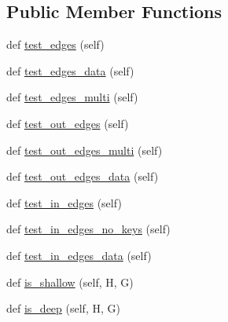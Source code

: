 \subsection*{Public Member Functions}
\begin{DoxyCompactItemize}
\item 
def \hyperlink{classnetworkx_1_1classes_1_1tests_1_1test__multidigraph_1_1BaseMultiDiGraphTester_aabcca493004584a7875a26432d0193cf}{test\+\_\+edges} (self)
\item 
def \hyperlink{classnetworkx_1_1classes_1_1tests_1_1test__multidigraph_1_1BaseMultiDiGraphTester_a5a4aa4bbf8aa82e121752d74f3365c61}{test\+\_\+edges\+\_\+data} (self)
\item 
def \hyperlink{classnetworkx_1_1classes_1_1tests_1_1test__multidigraph_1_1BaseMultiDiGraphTester_ab63cb805f6891bc146e9e20ce471c1f2}{test\+\_\+edges\+\_\+multi} (self)
\item 
def \hyperlink{classnetworkx_1_1classes_1_1tests_1_1test__multidigraph_1_1BaseMultiDiGraphTester_afb3bae3992033a70135a98c76c64c425}{test\+\_\+out\+\_\+edges} (self)
\item 
def \hyperlink{classnetworkx_1_1classes_1_1tests_1_1test__multidigraph_1_1BaseMultiDiGraphTester_a615031058e27dee8aca84f8d74879ff4}{test\+\_\+out\+\_\+edges\+\_\+multi} (self)
\item 
def \hyperlink{classnetworkx_1_1classes_1_1tests_1_1test__multidigraph_1_1BaseMultiDiGraphTester_ad3b6fbf6d62448a2dc9aa2b69a76c59a}{test\+\_\+out\+\_\+edges\+\_\+data} (self)
\item 
def \hyperlink{classnetworkx_1_1classes_1_1tests_1_1test__multidigraph_1_1BaseMultiDiGraphTester_a25f5c3bbbbac4eb189f0881acd0460ef}{test\+\_\+in\+\_\+edges} (self)
\item 
def \hyperlink{classnetworkx_1_1classes_1_1tests_1_1test__multidigraph_1_1BaseMultiDiGraphTester_abf7133fc0db0d416a2f0a2a6046e9ff5}{test\+\_\+in\+\_\+edges\+\_\+no\+\_\+keys} (self)
\item 
def \hyperlink{classnetworkx_1_1classes_1_1tests_1_1test__multidigraph_1_1BaseMultiDiGraphTester_a07285bde43c0013a06495f54e75aadbc}{test\+\_\+in\+\_\+edges\+\_\+data} (self)
\item 
def \hyperlink{classnetworkx_1_1classes_1_1tests_1_1test__multidigraph_1_1BaseMultiDiGraphTester_a4c58fec0238682b0d6a39fa334ad5616}{is\+\_\+shallow} (self, H, G)
\item 
def \hyperlink{classnetworkx_1_1classes_1_1tests_1_1test__multidigraph_1_1BaseMultiDiGraphTester_a096df43694e0ca886875b3456c72158d}{is\+\_\+deep} (self, H, G)

\end{DoxyCompactItemize}
